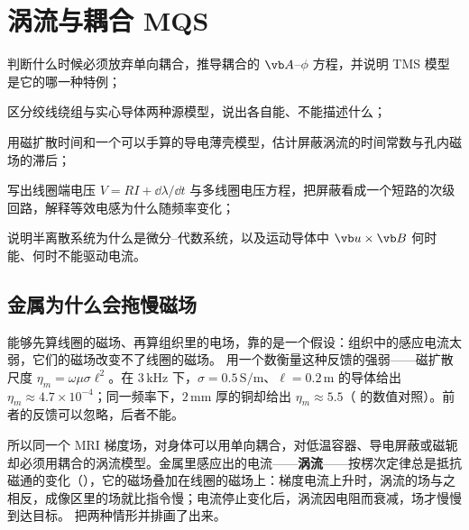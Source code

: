 \chapter{涡流与耦合 MQS}\label{ch:eddy}

\begin{chapterguide}
\begin{guidegoals}
\item 判断什么时候必须放弃单向耦合，推导耦合的 $\vb A$--$\phi$ 方程，并说明 TMS 模型是它的哪一种特例；
\item 区分绞线绕组与实心导体两种源模型，说出各自能、不能描述什么；
\item 用磁扩散时间和一个可以手算的导电薄壳模型，估计屏蔽涡流的时间常数与孔内磁场的滞后；
\item 写出线圈端电压 $V=RI+\dd\lambda/\dd t$ 与多线圈电压方程，把屏蔽看成一个短路的次级回路，解释等效电感为什么随频率变化；
\item 说明半离散系统为什么是微分--代数系统，以及运动导体中 $\vb u\times\vb B$ 何时能、何时不能驱动电流。
\end{guidegoals}
\end{chapterguide}

\section{金属为什么会拖慢磁场}\label{sec:eddy-scene}

 能够先算线圈的磁场、再算组织里的电场，靠的是一个假设：组织中的感应电流太弱，它们的磁场改变不了线圈的磁场。 用一个数衡量这种反馈的强弱——磁扩散尺度 $\eta_m=\omega\mu\sigma\ell^2$。在 $3\,\mathrm{kHz}$ 下，$\sigma=0.5\,\mathrm{S/m}$、$\ell=0.2\,\mathrm m$ 的导体给出 $\eta_m\approx4.7\times10^{-4}$；同一频率下，$2\,\mathrm{mm}$ 厚的铜却给出 $\eta_m\approx5.5$（ 的数值对照）。前者的反馈可以忽略，后者不能。

所以同一个 MRI 梯度场，对身体可以用单向耦合，对低温容器、导电屏蔽或磁轭却必须用耦合的涡流模型。金属里感应出的电流——\textbf{涡流}——按楞次定律总是抵抗磁通的变化（），它的磁场叠加在线圈的磁场上：梯度电流上升时，涡流的场与之相反，成像区里的场就比指令慢；电流停止变化后，涡流因电阻而衰减，场才慢慢到达目标。 把两种情形并排画了出来。

